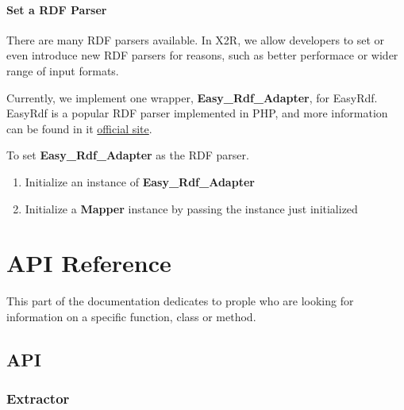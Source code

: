 \documentclass[letterpaper,10pt,english]{sphinxmanual}
\begin{document}
\subsubsection{Set a RDF Parser}
\label{docs/scenarios/mapper:set-a-rdf-parser}
There are many RDF parsers available. In X2R, we allow developers to set or even introduce new RDF parsers for reasons, such as better performace or wider range of input formats.

Currently, we implement one wrapper, \textbf{Easy\_Rdf\_Adapter}, for EasyRdf. EasyRdf is a popular RDF parser implemented in PHP, and more information can be found in it \href{http://www.easyrdf.org/}{official site}.

To set \textbf{Easy\_Rdf\_Adapter} as the RDF parser.
\begin{enumerate}
\item {} 
Initialize an instance of \textbf{Easy\_Rdf\_Adapter}

\item {} 
Initialize a \textbf{Mapper} instance by passing the instance just initialized

\end{enumerate}


\chapter{API Reference}
\label{index:api-reference}
This part of the documentation dedicates to prople who are looking for information on a specific function, class or method.


\section{API}
\label{docs/api:api}\label{docs/api::doc}\label{docs/api:id1}

\subsection{Extractor}
\label{docs/api:extractor}
\end{document}
